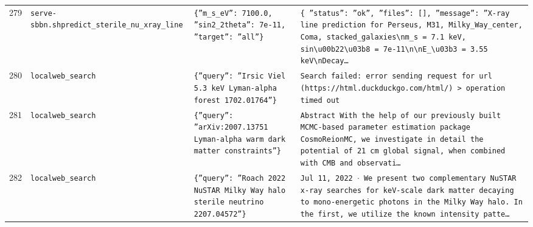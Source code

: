 \documentclass[11pt,a4paper]{article}
\begin{document}
\begin{longtable}{@{}p{}p{}p{}p{}@{}}
279 & \texttt{serve-sbbn.sh}\newline\texttt{predict\_\allowbreak{}sterile\_\allowbreak{}nu\_\allowbreak{}xray\_\allowbreak{}line} & \texttt{\{''m\_\allowbreak{}s\_\allowbreak{}eV'':\allowbreak{} 7100.0,\allowbreak{} ''sin2\_\allowbreak{}2theta'':\allowbreak{} 7e-11,\allowbreak{} ''target'':\allowbreak{} ''all''\}\allowbreak{}} & \texttt{\{   ''status'':\allowbreak{} ''ok'',\allowbreak{}   ''files'':\allowbreak{} []\allowbreak{},\allowbreak{}   ''message'':\allowbreak{} ''X-ray line prediction for Perseus,\allowbreak{} M31,\allowbreak{} Milky\_\allowbreak{}Way\_\allowbreak{}center,\allowbreak{} Coma,\allowbreak{} stacked\_\allowbreak{}galaxies\textbackslash{}\allowbreak{}nm\_\allowbreak{}s =\allowbreak{} 7.1 keV,\allowbreak{} sin\textbackslash{}\allowbreak{}u00b22\textbackslash{}\allowbreak{}u03b8 =\allowbreak{} 7e-11\textbackslash{}\allowbreak{}n\textbackslash{}\allowbreak{}nE\_\allowbreak{}\textbackslash{}\allowbreak{}u03b3 =\allowbreak{} 3.55 keV\textbackslash{}\allowbreak{}nDecay\ldots{}\allowbreak{}} \\
280 & \texttt{local}\newline\texttt{web\_\allowbreak{}search} & \texttt{\{''query'':\allowbreak{} ''Irsic Viel 5.3 keV Lyman-alpha forest 1702.01764''\}\allowbreak{}} & \texttt{Search failed:\allowbreak{} error sending request for url (https:\allowbreak{}/\allowbreak{}/\allowbreak{}html.duckduckgo.com/\allowbreak{}html/\allowbreak{})\allowbreak{} \textgreater{}\allowbreak{} operation timed out} \\
281 & \texttt{local}\newline\texttt{web\_\allowbreak{}search} & \texttt{\{''query'':\allowbreak{} ''arXiv:\allowbreak{}2007.13751 Lyman-alpha warm dark matter constraints''\}\allowbreak{}} & \texttt{Abstract With the help of our previously built MCMC-based parameter estimation package CosmoReionMC,\allowbreak{} we investigate in detail the potential of 21 cm global signal,\allowbreak{} when combined with CMB and observati\ldots{}\allowbreak{}} \\
282 & \texttt{local}\newline\texttt{web\_\allowbreak{}search} & \texttt{\{''query'':\allowbreak{} ''Roach 2022 NuSTAR Milky Way halo sterile neutrino 2207.04572''\}\allowbreak{}} & \texttt{Jul 11,\allowbreak{} 2022 $\cdot$ We present two complementary NuSTAR x-ray searches for keV-scale dark matter decaying to mono-energetic photons in the Milky Way halo. In the first,\allowbreak{} we utilize the known intensity patte\ldots{}\allowbreak{}} \\

\end{longtable}
\end{document}
